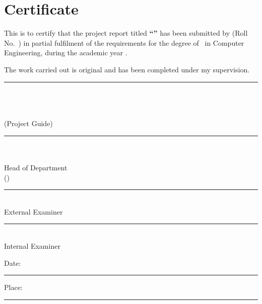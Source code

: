 \chapter*{Certificate}
\thispagestyle{empty}

\begin{center}
{\large\bfseries \collegename\par}
{\large \departmentname\par}
\end{center}

\vspace{1.0cm}

This is to certify that the project report titled \textbf{``\projecttitle''}
has been submitted by \textbf{\studentname} (Roll No.\ \studentroll) in partial
fulfilment of the requirements for the degree of \degreename\ in Computer
Engineering, during the academic year \academicyear.

\vspace{0.5cm}

The work carried out is original and has been completed under my supervision.

\vspace{2.5cm}

\noindent
\begin{minipage}[t]{0.45\textwidth}
\centering
\rule{5cm}{0.4pt}\\
\guidename\\
\guidedesignation\\
(Project Guide)
\end{minipage}
\hfill
\begin{minipage}[t]{0.45\textwidth}
\centering
\rule{5cm}{0.4pt}\\
\hodname\\
Head of Department\\
(\departmentname)
\end{minipage}

\vspace{2.0cm}

\noindent
\begin{minipage}[t]{0.45\textwidth}
\centering
\rule{5cm}{0.4pt}\\
External Examiner
\end{minipage}
\hfill
\begin{minipage}[t]{0.45\textwidth}
\centering
\rule{5cm}{0.4pt}\\
Internal Examiner
\end{minipage}

\vspace{1.5cm}

\noindent Date: \rule{4cm}{0.4pt} \hfill Place: \rule{4cm}{0.4pt}

\clearpage
